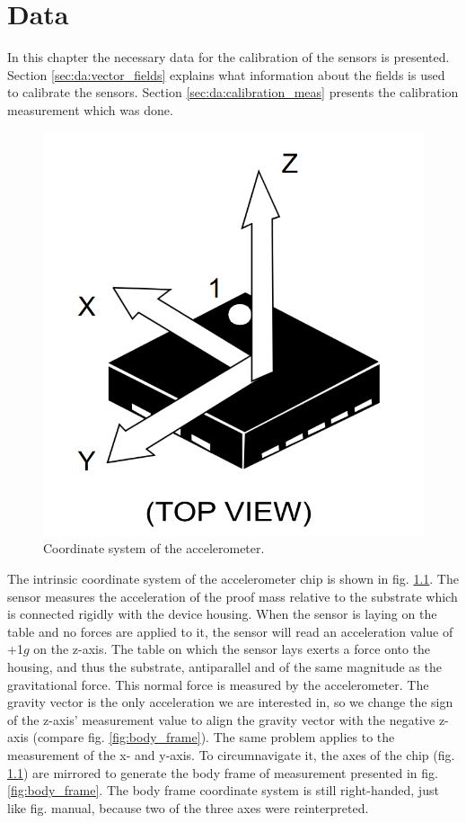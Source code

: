 \chapter{Data \label{ch:data}}
In this chapter the necessary data for the calibration of the sensors is presented. Section \ref{sec:da:vector_fields} explains what information about the fields is used to calibrate the sensors. Section \ref{sec:da:calibration_meas} presents the calibration measurement which was done. 


\begin{figure}
    \centering
    \includegraphics[width=\linewidth]{images/03_data/chip_coord_sys.png}
    \caption{Coordinate system of the accelerometer.}
    \label{fig:data:chip_coord_sys}
\end{figure}
The intrinsic coordinate system of the accelerometer chip is shown in fig. \ref{fig:data:chip_coord_sys}. The sensor measures the acceleration of the proof mass relative to the substrate which is connected rigidly with the device housing. When the sensor is laying on the table and no forces are applied to it, the sensor will read an acceleration value of +1$g$ on the z-axis. The table on which the sensor lays exerts a force onto the housing, and thus the substrate, antiparallel and of the same magnitude as the gravitational force. This normal force is measured by the accelerometer. The gravity vector is the only acceleration we are interested in, so we change the sign of the z-axis' measurement value to align the gravity vector with the negative z-axis (compare fig. \ref{fig:body_frame}). The same problem applies to the measurement of the x- and y-axis. To circumnavigate it, the axes of the chip (fig. \ref{fig:data:chip_coord_sys}) are mirrored to generate the body frame of measurement presented in fig. \ref{fig:body_frame}. The body frame coordinate system is still right-handed, just like fig. manual, because two of the three axes were reinterpreted.

